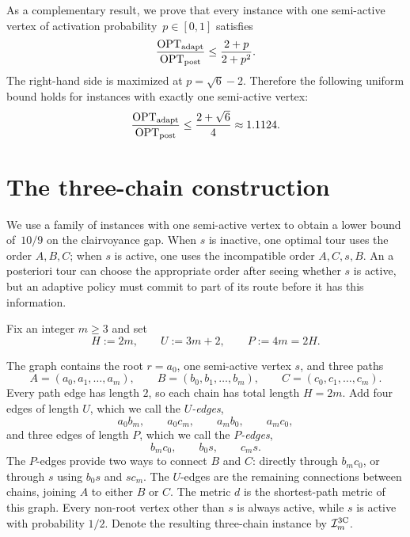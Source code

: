 \documentclass[12pt,a4paper,oneside]{report}
\begin{document}
As a complementary result, we prove that every instance with one
semi-active vertex of activation probability~$p\in[0,1]$ satisfies
\[
  \frac{\operatorname{OPT}_\mathrm{adapt}}{\operatorname{OPT}_\mathrm{post}}\le\frac{2+p}{2+p^2}.
\]
The right-hand side is maximized at $p=\sqrt6-2$.  Therefore the following
uniform bound holds for instances with exactly one semi-active vertex:
\[
  \frac{\operatorname{OPT}_\mathrm{adapt}}{\operatorname{OPT}_\mathrm{post}}
  \le\frac{2+\sqrt6}{4}
  \approx1.1124.
\]

\section{The three-chain construction}\label{sec:three-chain-construction}

We use a family of instances with one semi-active vertex to obtain a lower
bound of~$10/9$ on the clairvoyance gap.  When $s$ is inactive, one optimal
tour uses the order $A,B,C$; when $s$ is active, one uses the incompatible order
$A,C,s,B$.  An a posteriori tour can choose the appropriate order after seeing
whether $s$ is active, but an adaptive policy must commit to part of its route
before it has this information.

Fix an integer $m\ge3$ and set
\begin{equation}\label{eq:HUP}
  H:=2m,
  \qquad
  U:=3m+2,
  \qquad
  P:=4m=2H.
\end{equation}

\begin{construction}\label{con:three-chain}
The graph contains the root $r=a_0$, one semi-active vertex $s$, and three
paths
\[
  A=(a_0,a_1,\ldots,a_m),
  \qquad
  B=(b_0,b_1,\ldots,b_m),
  \qquad
  C=(c_0,c_1,\ldots,c_m).
\]
Every path edge has length $2$, so each chain has total length $H=2m$.
Add four edges of length $U$, which we call the \emph{$U$-edges},
\begin{equation}\label{eq:u-edges}
  a_0b_m,
  \qquad
  a_0c_m,
  \qquad
  a_mb_0,
  \qquad
  a_mc_0,
\end{equation}
and three edges of length $P$, which we call the \emph{$P$-edges},
\begin{equation}\label{eq:p-edges}
  b_mc_0,
  \qquad
  b_0s,
  \qquad
  c_ms.
\end{equation}
The $P$-edges provide two ways to connect $B$ and $C$: directly through
$b_mc_0$, or through $s$ using $b_0s$ and $sc_m$.  The $U$-edges are the
remaining connections between chains, joining $A$ to either $B$ or $C$.
The metric $d$ is the shortest-path metric of this graph.  Every non-root
vertex other than $s$ is always active, while $s$ is active with probability
$1/2$.  Denote the resulting three-chain instance by
$\mathcal{I}_{m}^{\mathrm{3C}}$.
\end{construction}
\end{document}
